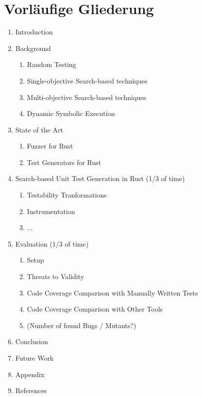 \documentclass{article}
\begin{document}
\section{Vorläufige Gliederung}
\begin{enumerate}
    \item Introduction
    \item Background \begin{enumerate}
        \item Random Testing
        \item Single-objective Search-based techniques
        \item Multi-objective Search-based techniques
        \item Dynamic Symbolic Execution
    \end{enumerate}
    \item State of the Art \begin{enumerate}
        \item Fuzzer for Rust
        \item Test Generators for Rust
    \end{enumerate}
    \item Search-based Unit Test Generation in Rust (1/3 of time) \begin{enumerate}
        \item Testability Tranformations
        \item Instrumentation
        \item ...
    \end{enumerate}
    \item Evaluation (1/3 of time) \begin{enumerate} 
        \item Setup 
        \item Threats to Validity
        \item Code Coverage Comparison with Manually Written Tests
        \item Code Coverage Comparison with Other Tools
        \item (Number of found Bugs / Mutants?)
    \end{enumerate}
    \item Conclusion
    \item Future Work
    \item Appendix
    \item References
\end{enumerate}
\end{document}
